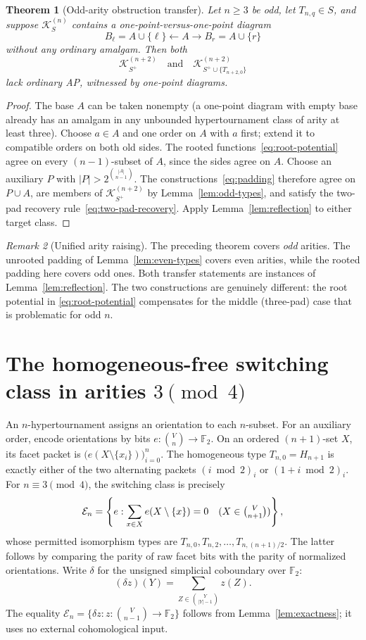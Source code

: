 \documentclass[11pt,a4paper]{article}
\newtheorem{theorem}{Theorem}[section]
\theoremstyle{remark}
\newtheorem{remark}[theorem]{Remark}
\newcommand{\F}{\mathbb F_2}
\newcommand{\K}{\mathcal K}
\newcommand{\E}{\mathcal E}
\begin{document}
\begin{theorem}[Odd-arity obstruction transfer]\label{thm:odd-lift}
Let $n\ge3$ be odd, let $T_{n,q}\in S$, and suppose
$\K^{(n)}_S$ contains a one-point-versus-one-point diagram
\[
 B_\ell=A\cup\{\ell\}\longleftarrow A
 \longrightarrow B_r=A\cup\{r\}
\]
without any ordinary amalgam. Then both
\[
 \K^{(n+2)}_{S^+}
 \quad\text{and}\quad
 \K^{(n+2)}_{S^+\cup\{T_{n+2,0}\}}
\]
lack ordinary AP, witnessed by one-point diagrams.
\end{theorem}
\begin{proof}
The base $A$ can be taken nonempty (a one-point diagram with empty
base already has an amalgam in any unbounded hypertournament class
of arity at least three). Choose $a\in A$ and one order on $A$
with $a$ first; extend it to compatible orders on both old sides.
The rooted functions~\eqref{eq:root-potential} agree on every
$(n-1)$-subset of $A$, since the sides agree on $A$.
Choose an auxiliary $P$ with $|P|>2^{\binom{|A|}{n-1}}$.
The constructions~\eqref{eq:padding} therefore agree on $P\cup A$,
are members of $\K^{(n+2)}_{S^+}$ by
Lemma~\ref{lem:odd-types}, and satisfy the two-pad recovery
rule~\eqref{eq:two-pad-recovery}. Apply
Lemma~\ref{lem:reflection} to either target class.
\end{proof}

\begin{remark}[Unified arity raising]
The preceding theorem covers \emph{odd} arities. The unrooted padding of Lemma~\ref{lem:even-types}
covers even arities, while the rooted padding here covers odd ones.
Both transfer statements are instances of Lemma~\ref{lem:reflection}. The two constructions
are genuinely different: the root potential in \eqref{eq:root-potential}
compensates for the middle (three-pad) case that is problematic for odd $n$.
\end{remark}



\section{The homogeneous-free switching class in arities $3\pmod4$}\label{sec:three-four}
An $n$-hypertournament assigns an orientation to each $n$-subset.
For an auxiliary order, encode orientations by bits
$e:\binom Vn\to\F$. On an ordered $(n+1)$-set $X$, its facet packet is
$\bigl(e(X\setminus\{x_i\})\bigr)_{i=0}^{n}$.
The homogeneous type $T_{n,0}=H_{n+1}$ is exactly either of the two
alternating packets $(i\bmod2)_i$ or $(1+i\bmod2)_i$.
For $n\equiv3\pmod4$, the switching class is precisely
\[
\E_n=\left\{e:\sum_{x\in X}e(X\setminus\{x\})=0
\quad(X\in\tbinom V{n+1})\right\},
\]
whose permitted isomorphism types are $T_{n,0},T_{n,2},\ldots,
T_{n,(n+1)/2}$. The latter follows by comparing the parity of raw
facet bits with the parity of normalized orientations.
Write $\delta$ for the unsigned simplicial coboundary over $\F$:
\[
 (\delta z)(Y)=\sum_{Z\in\binom Y{|Y|-1}}z(Z).
\]
The equality $\E_n=\{\delta z:z:\binom V{n-1}\to\F\}$
follows from Lemma~\ref{lem:exactness}; it uses no external
cohomological input.
\end{document}
